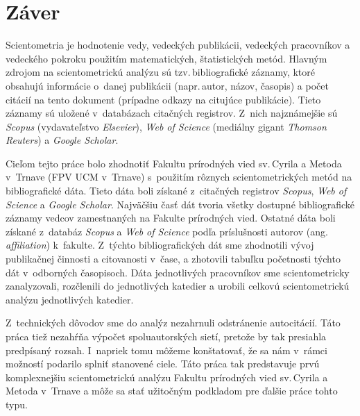 \chapter*{Záver}

Scientometria je hodnotenie vedy, vedeckých publikácii, vedeckých pracovníkov a
vedeckého pokroku použitím matematických, štatistických metód. Hlavným zdrojom
na scientometrickú analýzu sú tzv.\,bibliografické záznamy, ktoré obsahujú
informácie o~danej publikácii (napr.\,autor, názov, časopis) a počet citácií na
tento dokument (prípadne odkazy na citujúce publikácie). Tieto záznamy sú
uložené v~databázach citačných registrov. Z~nich najznámejšie sú \emph{Scopus}
(vydavateľstvo \emph{Elsevier}), \emph{Web of Science} (mediálny gigant
\emph{Thomson Reuters}) a \emph{Google Scholar}.

Cieľom tejto práce bolo zhodnotiť Fakultu prírodných vied sv.\,Cyrila a Metoda
v~Trnave (FPV UCM v~Trnave) s~použitím rôznych scientometrických metód na
bibliografické dáta.  Tieto dáta boli získané z~citačných registrov
\emph{Scopus}, \emph{Web of Science} a \emph{Google Scholar}. Najväčšiu časť dát
tvoria všetky dostupné bibliografické záznamy vedcov zamestnaných na Fakulte
prírodných vied.  Ostatné dáta boli získané z~databáz \emph{Scopus} a \emph{Web
  of Science} podľa príslušnosti autorov (ang.\,\emph{affiliation})
k~fakulte. Z~týchto bibliografických dát sme zhodnotili vývoj publikačnej
činnosti a citovanosti v~čase, a zhotovili tabuľku početnosti týchto dát
v~odborných časopisoch. Dáta jednotlivých pracovníkov sme scientometricky
zanalyzovali, rozčlenili do jednotlivých katedier a urobili celkovú
scientometrickú analýzu jednotlivých katedier.

Z~technických dôvodov sme do analýz nezahrnuli odstránenie autocitácií. Táto
práca tiež nezahŕňa výpočet spoluautorských sietí, pretože by tak presiahla
predpísaný rozsah.  I~napriek tomu môžeme konštatovať, že sa nám v~rámci
možností podarilo splniť stanovené ciele. Táto práca tak predstavuje prvú
komplexnejšiu scientometrickú analýzu Fakultu prírodných vied sv.\,Cyrila a
Metoda v~Trnave a môže sa stať užitočným podkladom pre ďalšie práce tohto typu.

